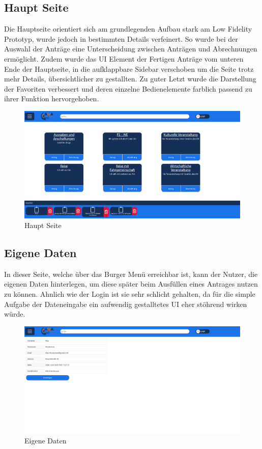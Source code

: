 \subsection{Haupt Seite}\label{Haupt Seite}
Die Hauptseite orientiert sich am grundlegenden Aufbau stark am Low Fidelity Prototyp, 
wurde jedoch in bestimmten Details verfeinert. So wurde bei der Auswahl der Anträge eine 
Unterscheidung zwischen Anträgen und Abrechnungen ermöglicht. Zudem wurde das \ac{UI} 
Element der Fertigen Anträge vom unteren Ende der Hauptseite, in die aufklappbare Sidebar
verschoben um die Seite trotz mehr Details, übersichtlicher zu gestallten. Zu guter Letzt 
wurde die Darstellung der Favoriten verbessert und deren einzelne Bedienelemente farblich 
passend zu ihrer Funktion hervorgehoben.

\begin{figure}[h]
  \centering
    \includegraphics[width=1.0\textwidth]{Doc/images/Landing Page.png}
    \caption{Haupt Seite}\label{Hautp Seite}
\end{figure}

\pagebreak

\subsection{Eigene Daten}\label{Eigene Daten}
In dieser Seite, welche über das Burger Menü erreichbar ist, kann der Nutzer, die eigenen 
Daten hinterlegen, um diese später beim Ausfüllen eines Antrages nutzen zu können. Ahnlich 
wie der Login ist sie sehr schlicht gehalten, da für die simple Aufgabe der Dateneingabe ein
aufwendig gestalltetes \ac{UI} eher stöhrend wirken würde.

\begin{figure}[h]
  \centering
    \includegraphics[width=1.0\textwidth]{Doc/images/Own Data.png}
    \caption{Eigene Daten}\label{Eigene Daten}
\end{figure}

